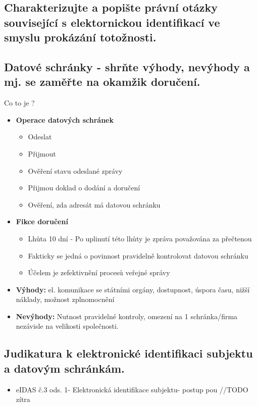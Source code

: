\subsection{Charakterizujte a popište právní otázky související s elektornickou identifikací ve smyslu prokázání totožnosti.}


\subsection{Datové schránky - shrňte výhody, nevýhody a mj. se zaměřte na okamžik doručení.}
\item Co to je ?\begin{itemize}
    \begin{itemize}
        \item Podle nařízení eIDAS čl. 3 bod 38 služba, která umožňuje přenášet data mezi třetími osobami elektronickými prostředky a poskytuje důkazy týkající se nakládání s přenášenými daty včetně dokladu o odeslání a přijetí dat, které chrání přenášená data před rizikem ztráty, krádeže, nebo poškození
        \item Spolehlivý způsob komunikace s veřejnou správou 
        \item Fikce doručení - garantuje doručení
        \item Spravováno Ministerstvem vnitra
    \end{itemize}
\item\textbf{Operace datových schránek}
    \begin{itemize}
        \item Odeslat
        \item Přijmout
        \item Ověření stavu odeslané zprávy
        \item Přijmou doklad o dodání a doručení
        \item Ověření, zda adresát má datovou schránku
    \end{itemize}
\item\textbf{Fikce doručení}
    \begin{itemize}
        \item Lhůta 10 dní - Po uplinutí této lhůty je zpráva považována za přečtenou
        \item Fakticky se jedná o povinnost pravidelně kontrolovat datovou schránku
        \item Účelem je zefektivnění procesů veřejné správy
    \end{itemize}
\item \textbf{Výhody:} el. komunikace se státními orgány, dostupnost, úspora času, nižší náklady, možnost zplnomocnění
\item \textbf{Nevýhody:} Nutnost pravidelné kontroly, omezení na 1 schránka/firma nezávisle na velikosti společnosti.
\end{itemize}


\subsection{Judikatura k elektronické identifikaci subjektu a datovým schránkám.}
\begin{itemize}
    \item eIDAS č.3 ods. 1- Elektronická identifikace subjektu- postup pou
    //TODO zítra
\end{itemize}

